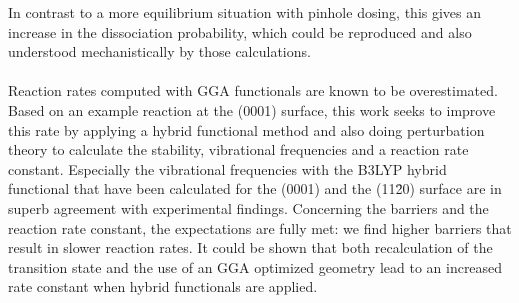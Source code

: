 \documentclass[11pt,DIV=13,BCOR=5mm,a4paper,headinclude]{scrbook}
\begin{document}
In contrast to a more equilibrium situation with pinhole dosing, this gives an increase in the dissociation probability, which could be reproduced and also understood mechanistically by those calculations.
\\\\
Reaction rates computed with GGA functionals are known to be overestimated.
Based on an example reaction at the (0001) surface, this work seeks to improve this rate by applying a hybrid functional method and also doing perturbation theory to calculate the stability, vibrational frequencies and a reaction rate constant.
Especially the vibrational frequencies with the B3LYP hybrid functional that have been calculated for the (0001) and the (11\=20) surface are in superb agreement with experimental findings.
Concerning the barriers and the reaction rate constant, the expectations are fully met: we find higher barriers that result in slower reaction rates.
It could be shown that both recalculation of the transition state and the use of an GGA optimized geometry lead to an increased rate constant when hybrid functionals are applied.

\end{document}
